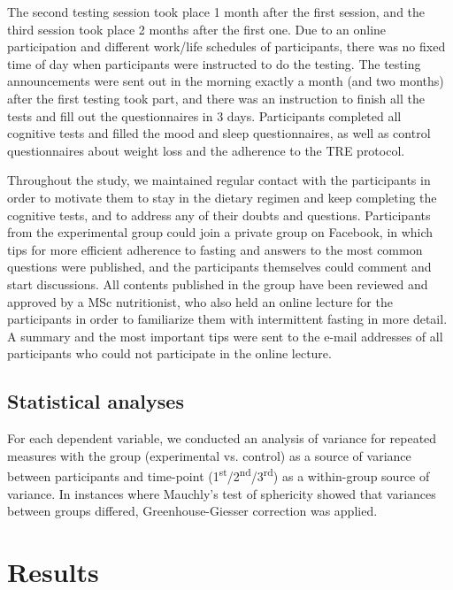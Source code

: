 \documentclass[authordate, empirical]{jote-new-article}
\begin{document}
The second testing session took place 1 month after the first session, and the third session took place 2 months after the first one. Due to an online participation and different work/life schedules of participants, there was no fixed time of day when participants were instructed to do the testing. The testing announcements were sent out in the morning exactly a month (and two months) after the first testing took part, and there was an instruction to finish all the tests and fill out the questionnaires in 3 days. Participants completed all cognitive tests and filled the mood and sleep questionnaires, as well as control questionnaires about weight loss and the adherence to the TRE protocol.



Throughout the study, we maintained regular contact with the participants in order to motivate them to stay in the dietary regimen and keep completing the cognitive tests, and to address any of their doubts and questions. Participants from the experimental group could join a private group on Facebook, in which tips for more efficient adherence to fasting and answers to the most common questions were published, and the participants themselves could comment and start discussions. All contents published in the group have been reviewed and approved by a MSc nutritionist, who also held an online lecture for the participants in order to familiarize them with intermittent fasting in more detail. A summary and the most important tips were sent to the e-mail addresses of all participants who could not participate in the online lecture.


\subsection{Statistical analyses}

For each dependent variable, we conducted an analysis of variance for repeated measures with the group (experimental vs. control) as a source of variance between participants and time-point (1\textsuperscript{st}/2\textsuperscript{nd}/3\textsuperscript{rd}) as a within-group source of variance. In instances where Mauchly's test of sphericity showed that variances between groups differed, Greenhouse-Giesser correction was applied.


\section{Results }
\end{document}
